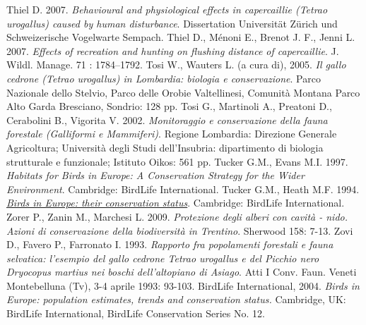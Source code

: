 \documentclass[10pt,twoside,openany,x11names,svgnames,italian,a5paper,dvipsnames,table]{memoir}
\newcommand{\chaptercolor}{G10}
\newcommand{\backpagecolor}{\chaptercolor}
\begin{document}
\begin{thebibliography}{9}
Thiel D. 2007. \emph{Behavioural and physiological effects in capercaillie (\emph{Tetrao urogallus}) caused by human disturbance}. Dissertation Universität Zürich und Schweizerische Vogelwarte Sempach.
Thiel D., Ménoni E., Brenot J. F., Jenni L. 2007. \emph{Effects of recreation and hunting on flushing distance of capercaillie}. J. Wildl. Manage. 71 : 1784–1792.
Tosi W., Wauters L. (a cura di), 2005. \emph{Il gallo cedrone (\emph{Tetrao urogallus}) in Lombardia: biologia e conservazione}. Parco Nazionale dello Stelvio, Parco delle Orobie Valtellinesi, Comunità Montana Parco Alto Garda Bresciano, Sondrio: 128 pp.
Tosi G., Martinoli A., Preatoni D., Cerabolini B., Vigorita V. 2002. \emph{Monitoraggio e conservazione della fauna forestale (Galliformi e Mammiferi)}. Regione Lombardia: Direzione Generale Agricoltura; Università degli Studi dell’Insubria: dipartimento di biologia strutturale e funzionale; Istituto Oikos: 561 pp.
Tucker G.M., Evans M.I. 1997. \emph{Habitats for Birds in Europe: A Conservation Strategy for the Wider Environment}. Cambridge: BirdLife International.
Tucker G.M., Heath M.F. 1994. \href{https://www.uam.es/personal_pdi/ciencias/jonate/Investigacion/CLI/CLI-1.pdf}{\emph{Birds in Europe: their conservation status}}. Cambridge: BirdLife International.
Zorer P., Zanin M., Marchesi L. 2009. \emph{Protezione degli alberi con cavità - nido. Azioni di conservazione della biodiversità in Trentino}. Sherwood 158: 7-13.
Zovi D., Favero P., Farronato I. 1993. \emph{Rapporto fra popolamenti forestali e fauna selvatica: l'esempio del gallo cedrone \emph{Tetrao urogallus} e del Picchio nero \emph{Dryocopus martius} nei boschi dell’altopiano di Asiago}. Atti I Conv. Faun. Veneti Montebelluna (Tv), 3-4 aprile 1993: 93-103.
 BirdLife International, 2004. \emph{Birds in Europe: population estimates, trends and conservation status.} Cambridge, UK: BirdLife International, BirdLife Conservation Series No. 12.






\end{thebibliography}
\cleartoverso



\normalsize
\enlargethispage{3\baselineskip}
\thispagestyle{empty}
\pagecolor{\backpagecolor}
\end{document}
